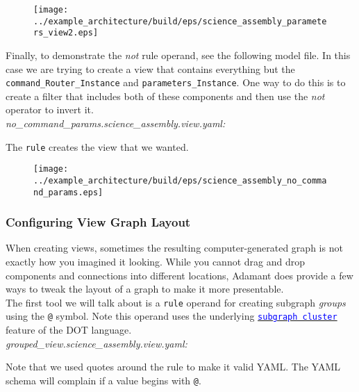 \begin{figure}[H]
  \texttt{[image: ../example\_architecture/build/eps/science\_assembly\_parameters\_view2.eps]}
\end{figure}

Finally, to demonstrate the \textit{not} rule operand, see the following model file. In this case we are trying to create a view that contains everything but the \texttt{command\_Router\_Instance} and \texttt{parameters\_Instance}. One way to do this is to create a filter that includes both of these components and then use the \textit{not} operator to invert it. \\

\textit{no\_command\_params.science\_assembly.view.yaml:}

The \texttt{rule} creates the view that we wanted.

\begin{figure}[H]
  \texttt{[image: ../example\_architecture/build/eps/science\_assembly\_no\_command\_params.eps]}
\end{figure}

\subsubsection{Configuring View Graph Layout} \label{Configuring View Graph Layout}

When creating views, sometimes the resulting computer-generated graph is not exactly how you imagined it looking. While you cannot drag and drop components and connections into different locations, Adamant does provide a few ways to tweak the layout of a graph to make it more presentable. \\

The first tool we will talk about is a \texttt{rule} operand for creating subgraph \textit{groups} using the \texttt{@} symbol. Note this operand uses the underlying \href{https://www.graphviz.org/doc/info/attrs.html#d:clusterrank}{\textcolor{blue}{\texttt{subgraph cluster}}} feature of the DOT language. \\

\textit{grouped\_view.science\_assembly.view.yaml:}

Note that we used quotes around the rule to make it valid YAML. The YAML schema will complain if a value begins with \texttt{@}. \\

